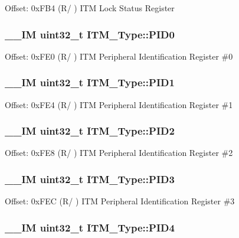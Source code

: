 Offset\-: 0x\-F\-B4 (R/ ) I\-T\-M Lock Status Register \hypertarget{struct_i_t_m___type_ab4a4cc97ad658e9c46cf17490daffb8a}{
\subsubsection[{P\-I\-D0}]{\setlength{\rightskip}{0pt plus 5cm}\-\_\-\-\_\-\-I\-M uint32\-\_\-t I\-T\-M\-\_\-\-Type\-::\-P\-I\-D0}}\label{struct_i_t_m___type_ab4a4cc97ad658e9c46cf17490daffb8a}
Offset\-: 0x\-F\-E0 (R/ ) I\-T\-M Peripheral Identification Register \#0 \hypertarget{struct_i_t_m___type_a89ea1d805a668d6589b22d8e678eb6a4}{
\subsubsection[{P\-I\-D1}]{\setlength{\rightskip}{0pt plus 5cm}\-\_\-\-\_\-\-I\-M uint32\-\_\-t I\-T\-M\-\_\-\-Type\-::\-P\-I\-D1}}\label{struct_i_t_m___type_a89ea1d805a668d6589b22d8e678eb6a4}
Offset\-: 0x\-F\-E4 (R/ ) I\-T\-M Peripheral Identification Register \#1 \hypertarget{struct_i_t_m___type_a8471c4d77b7107cf580587509da69f38}{
\subsubsection[{P\-I\-D2}]{\setlength{\rightskip}{0pt plus 5cm}\-\_\-\-\_\-\-I\-M uint32\-\_\-t I\-T\-M\-\_\-\-Type\-::\-P\-I\-D2}}\label{struct_i_t_m___type_a8471c4d77b7107cf580587509da69f38}
Offset\-: 0x\-F\-E8 (R/ ) I\-T\-M Peripheral Identification Register \#2 \hypertarget{struct_i_t_m___type_af317d5e2d946d70e6fb67c02b92cc8a3}{
\subsubsection[{P\-I\-D3}]{\setlength{\rightskip}{0pt plus 5cm}\-\_\-\-\_\-\-I\-M uint32\-\_\-t I\-T\-M\-\_\-\-Type\-::\-P\-I\-D3}}\label{struct_i_t_m___type_af317d5e2d946d70e6fb67c02b92cc8a3}
Offset\-: 0x\-F\-E\-C (R/ ) I\-T\-M Peripheral Identification Register \#3 \hypertarget{struct_i_t_m___type_aad5e11dd4baf6d941bd6c7450f60a158}{
\subsubsection[{P\-I\-D4}]{\setlength{\rightskip}{0pt plus 5cm}\-\_\-\-\_\-\-I\-M uint32\-\_\-t I\-T\-M\-\_\-\-Type\-::\-P\-I\-D4}}\label{struct_i_t_m___type_aad5e11dd4baf6d941bd6c7450f60a158}
